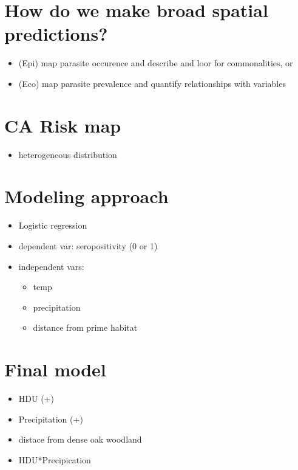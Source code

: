 \documentclass{article}
\begin{document}
    \section{How do we make broad spatial predictions?}
        \begin{itemize}
            \item (Epi) map parasite occurence and describe and loor for commonalities, or
            \item (Eco) map parasite prevalence and quantify relationships with variables
        \end{itemize}

    \section{CA Risk map}
        \begin{itemize}
            \item heterogeneous distribution
        \end{itemize}

    \section{Modeling approach}
        \begin{itemize}
            \item Logistic regression
            \item dependent var: seropositivity (0 or 1)
            \item independent vars:
            \begin{itemize}
                \item temp
                \item precipitation
                \item distance from prime habitat
            \end{itemize}
        \end{itemize}

    \section{Final model}
        \begin{itemize}
            \item HDU (+)
            \item Precipitation (+)
            \item distace from dense oak woodland
            \item HDU*Precipication
        \end{itemize}
\end{document}
